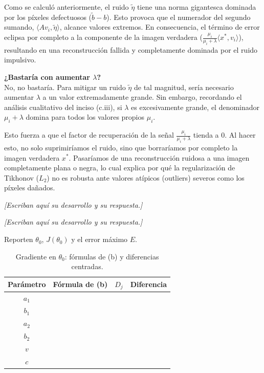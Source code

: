 \documentclass{article}
\newcommand\pendiente{{\color{gris90}\itshape [Escriban aquí su desarrollo y su respuesta.]}}
\begin{document}
\begin{enumerate}[label=\roman*., widest=iii]
  Como se calculó anteriormente, el ruido $\tilde{\eta}$ tiene una norma gigantesca dominada por los píxeles defectuosos ($\tilde{b} - b$). Esto provoca que el numerador del segundo sumando, $\langle A v_i, \tilde{\eta} \rangle$, alcance valores extremos. En consecuencia, el término de error eclipsa por completo a la componente de la imagen verdadera ($\frac{\mu_i}{\mu_i + \lambda} \langle x^*, v_i \rangle$), resultando en una reconstrucción fallida y completamente dominada por el ruido impulsivo.

\textbf{¿Bastaría con aumentar $\lambda$?} \\

  No, no bastaría. Para mitigar un ruido $\tilde{\eta}$ de tal magnitud, sería necesario aumentar $\lambda$ a un valor extremadamente grande. Sin embargo, recordando el análisis cualitativo del inciso (c.iii), si $\lambda$ es excesivamente grande, el denominador $\mu_i + \lambda$ domina para todos los valores propios $\mu_i$. 

  Esto fuerza a que el factor de recuperación de la señal $\frac{\mu_i}{\mu_i + \lambda}$ tienda a $0$. Al hacer esto, no solo suprimiríamos el ruido, sino que borraríamos por completo la imagen verdadera $x^*$. Pasaríamos de una reconstrucción ruidosa a una imagen completamente plana o negra, lo cual explica por qué la regularización de Tikhonov ($L_2$) no es robusta ante valores atípicos (outliers) severos como los píxeles dañados.

\end{enumerate}
\despueslista




\pendiente


\pendiente


Reporten $\theta_0$, $J(\theta_0)$ y el error máximo $E$.

\begin{table}[H]
  \centering
  \begin{tabular}{>{\filatabla}c r r r}
    \toprule[0.8bp]
    Parámetro & Fórmula de (b) & $D_j$ & Diferencia \\
    \midrule[0.4bp]
    $a_1$ & & & \\
    $b_1$ & & & \\
    $a_2$ & & & \\
    $b_2$ & & & \\
    $v$   & & & \\
    $c$   & & & \\
    \bottomrule[0.8bp]
  \end{tabular}
  \caption{Gradiente en $\theta_0$: fórmulas de (b) y diferencias centradas.}
  \label{tab:gradiente}
\end{table}
\end{document}
